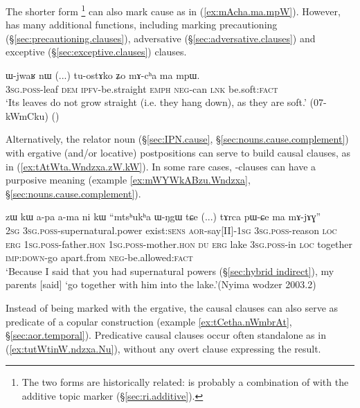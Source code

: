 The shorter form \footnote{The two forms are historically related:  is probably a combination of  with the additive topic marker  (§\ref{sec:ri.additive}). } can also mark cause as in (\ref{ex:mAcha.ma.mpW}). However,  has many additional functions, including marking precautioning (§\ref{sec:precautioning.clauses}), adversative (§\ref{sec:adversative.clauses}) and exceptive (§\ref{sec:exceptive.clauses}) clauses.

\begin{exe}
\ex \label{ex:mAcha.ma.mpW}
\gll ɯ-jwaʁ nɯ (...) tu-ostɤko ʑo mɤ-cʰa ma mpɯ. \\
\textsc{3sg}.\textsc{poss}-leaf \textsc{dem} { } \textsc{ipfv}-be.straight \textsc{emph} \textsc{neg}-can \textsc{lnk} be.soft:\textsc{fact} \\
\glt `Its leaves do not grow straight (i.e. they hang down), as they are soft.' (07-kWmCku)
()
\end{exe}

Alternatively, the relator noun  (§\ref{sec:IPN.cause}, §\ref{sec:nouns.cause.complement}) with ergative (and/or locative) postpositions can serve to build causal clauses, as in (\ref{ex:tAtWta.Wndzxa.zW.kW}). In some rare cases, -clauses can have a purposive meaning (example \ref{ex:mWYWkABzu.Wndzxa}, §\ref{sec:nouns.cause.complement}).

\begin{exe}
\ex \label{ex:tAtWta.Wndzxa.zW.kW}
 zɯ kɯ a-pa a-ma ni kɯ ``mtsʰukʰa ɯ-ŋgɯ tɕe (...) tɤrca pɯ-ɕe ma mɤ-jɤɣ'' \\
\textsc{2sg} \textsc{3sg}.\textsc{poss}-supernatural.power exist:\textsc{sens} \textsc{aor}-say[II]-\textsc{1sg} \textsc{3sg}.\textsc{poss}-reason \textsc{loc} \textsc{erg} \textsc{1sg}.\textsc{poss}-father.\textsc{hon} \textsc{1sg}.\textsc{poss}-mother.\textsc{hon} \textsc{du} \textsc{erg} lake \textsc{3sg}.\textsc{poss}-in \textsc{loc} {  } together \textsc{imp}:\textsc{down}-go apart.from \textsc{neg}-be.allowed:\textsc{fact} \\
\glt `Because I said that you had supernatural powers (§\ref{sec:hybrid indirect}), my parents [said] `go together with him into the lake.'(Nyima wodzer 2003.2)
\end{exe}

Instead of being marked with the ergative, the causal clauses can also serve as predicate of a copular construction (example \ref{ex:tCetha.nWmbrAt}, §\ref{sec:aor.temporal}). Predicative causal clauses occur often standalone as in (\ref{ex:tutWtinW.ndzxa.Nu}), without any overt clause expressing the result.


